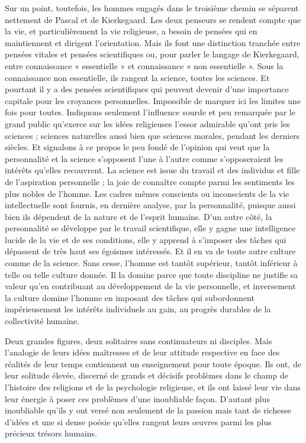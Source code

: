 \documentclass[12pt,a4paper]{article}
\newcommand{\opage}[1]{\marginnote{\footnotesize\textit{[#1]}}}
\begin{document}
Sur un point, toutefois, les hommes engagés dans le troisième
chemin se séparent nettement de Pascal et de Kierkegaard. Les
deux penseurs se rendent compte que la vie, et particulièrement la
vie religieuse, a besoin de pensées qui en maintiennent et dirigent
l'orientation. Mais ils font une distinction tranchée entre pensées
vitales et pensées scientifiques ou, pour parler le langage de Kierkegaard,
entre connaissance « essentielle » et connaissance « non
essentielle ». Sous la connaissance non essentielle, ils rangent la
science, toutes les sciences. Et pourtant il y a des pensées scientifiques
qui peuvent devenir d'une importance capitale pour les
croyances personnelles. Impossible de marquer ici les limites une
fois pour toutes. Indiquons seulement l'influence sourde et peu
remarquée par le grand public qu'exerce sur les idées religieuses
l'essor admirable qu'ont pris les sciences ; sciences naturelles aussi
bien que sciences morales, pendant les derniers siècles. Et signalons
à ce propos le peu fondé de l'opinion qui veut que la personnalité
et la science s'opposent l'une à l'autre comme s'opposeraient
les intérêts qu'elles recouvrent. La science est issue du travail et des
individus et fille de l'aspiration personnelle ; la joie de connaître
compte parmi les sentiments les plus nobles de l'homme. Les
cadres mêmes conscients ou inconscients de la vie intellectuelle
sont fournis, en dernière analyse, par la personnalité, puisque aussi
bien ils dépendent de la nature et de l'esprit humains. D'un autre
côté, la personnalité se développe par le travail scientifique, elle y
\opage{246} gagne une intelligence lucide de la vie et de ses conditions, elle y
apprend à s'imposer des tâches qui dépassent de très haut ses
égoïsmes intéressés. Et il en va de toute autre culture comme de la
science. Sans cesse, l'homme est tantôt supérieur, tantôt inférieur à
telle ou telle culture donnée. Il la domine parce que toute discipline
ne justifie sa valeur qu'en contribuant au développement de
la vie personnelle, et inversement la culture domine l'homme en
imposant des tâches qui subordonnent impérieusement les intérêts
individuels au gain, au progrès durables de la collectivité humaine.

\bigskip

Deux grandes figures, deux solitaires sans continuateurs ni disciples.
Mais l'analogie de leurs idées maîtresses et de leur attitude
respective en face des réalités de leur temps contiennent un enseignement
pour toute époque. Ils ont, de leur solitude élevée, discerné
de grands et décisifs problèmes dans le champ de l'histoire
des religions et de la psychologie religieuse, et ils ont laissé leur
vie dans leur énergie à poser ces problèmes d'une inoubliable façon.
D'autant plus inoubliable qu'ils y ont versé non seulement de la
passion mais tant de richesse d'idées et une si dense poésie qu'elles
rangent leurs œuvres parmi les plus précieux trésors humains.
\end{document}
